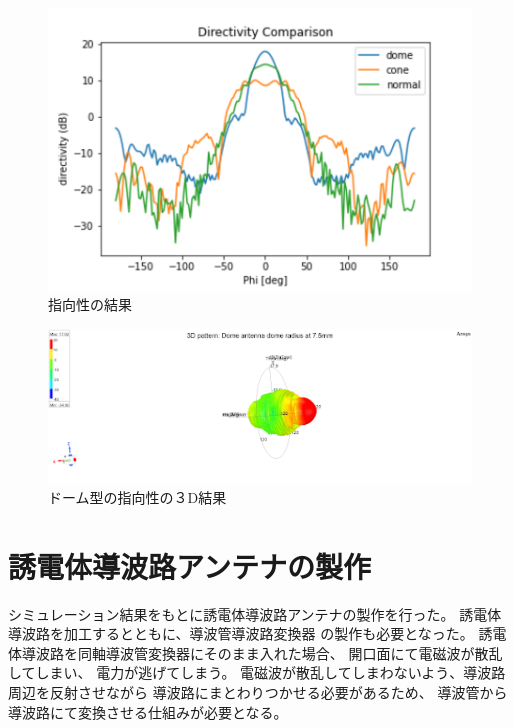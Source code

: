 \documentclass[technicalreport]{ieicej}
\begin{document}
\begin{figure}[tb]
  \begin{center}
    \includegraphics[bb=0.000000 0.000000 432.098422 288.065615, width=1.0\linewidth]{img/directivity_comparison.pdf}
    \caption{指向性の結果}
    \label{fig:directivity_results}
  \end{center}
\end{figure}

\begin{figure}[tb]
  \begin{center}
    \includegraphics[bb=0 0 324 216, width=1.0\linewidth]{img/dome_directivity.pdf}
    \caption{ドーム型の指向性の３D結果}
    \label{fig:dome_3d_directivity_results}
  \end{center}
\end{figure}


\section{誘電体導波路アンテナの製作}

シミュレーション結果をもとに誘電体導波路アンテナの製作を行った。
誘電体導波路を加工するとともに、導波管導波路変換器
の製作も必要となった。
誘電体導波路を同軸導波管変換器にそのまま入れた場合、
開口面にて電磁波が散乱してしまい、
電力が逃げてしまう。
電磁波が散乱してしまわないよう、導波路周辺を反射させながら
導波路にまとわりつかせる必要があるため、
導波管から導波路にて変換させる仕組みが必要となる。
\end{document}
